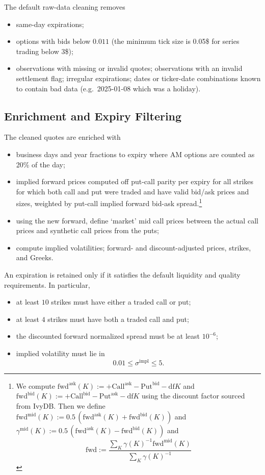\documentclass[11pt,a4paper]{article}
\begin{document}
The default raw-data cleaning removes
%
\begin{itemize}
    \item same-day expirations;
    \item options with bids below \(0.011\) (the minimum tick size is 0.05\$ for series trading below 3\$);
    \item observations with missing or invalid quotes; observations with an invalid settlement flag; irregular expirations; dates or ticker-date combinations known to contain bad data (e.g.~2025-01-08 which was a holiday).
\end{itemize}

\subsection{Enrichment and Expiry Filtering}

The cleaned quotes are enriched with
%
\begin{itemize}
    \item business days and year fractions to expiry where AM options are counted as 20\% of
    the day;
    \item implied forward prices computed off put-call parity per expiry for all strikes
          for which both call and put were traded and have valid bid/ask prices and sizes, weighted by put-call implied forward bid-ask spread.\footnote{
            We compute
            $\mathrm{fwd}^\mathrm{ask}(K):=+\mathrm{Call}^\mathrm{ask}-\mathrm{Put}^\mathrm{bid}-\mathrm{df} K$ and
            $\mathrm{fwd}^\mathrm{bid}(K):=+\mathrm{Call}^\mathrm{bid}-\mathrm{Put}^\mathrm{ask}-\mathrm{df} K$ using the discount factor sourced from IvyDB. 
            Then we
            define $\mathrm{fwd}^\mathrm{mid}(K) := 0.5\,(\mathrm{fwd}^\mathrm{ask}(K) + \mathrm{fwd}^\mathrm{bid}(K))$ and $\gamma^\mathrm{mid}(K) := 0.5\,(\mathrm{fwd}^\mathrm{ask}(K) - \mathrm{fwd}^\mathrm{bid}(K))$ and
            $$
                \mathrm{fwd} :=\frac{ \sum_K \gamma(K)^{-1} \mathrm{fwd}^\mathrm{mid}(K) }
                 { \sum_K \gamma(K)^{-1} }
            $$
          }
    \item using the new forward, define `market' mid call prices between the actual call
    prices and synthetic call prices from the puts;
    \item compute implied volatilities; forward- and discount-adjusted prices, strikes, and Greeks.
\end{itemize}
An expiration is retained only if it satisfies the default liquidity and quality requirements. In particular,
%
\begin{itemize}
    \item at least \(10\) strikes must have either a traded call or put;
    \item at least \(4\) strikes must have both a traded call and put;
    \item the discounted forward normalized spread must be at least \(10^{-6}\);
    \item implied volatility must lie in
    \[
        0.01 \leq \sigma^{\mathrm{impl}} \leq 5.
    \]
\end{itemize}
\end{document}
